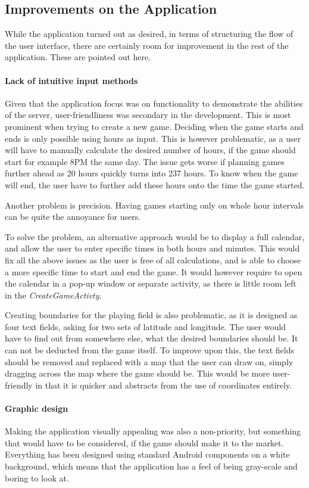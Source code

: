\subsection{Improvements on the Application}
While the application turned out as desired, in terms of structuring the flow of the user interface, there are certainly room for improvement in the rest of the application. These are pointed out here.

\paragraph{Lack of intuitive input methods}
Given that the application focus was on functionality to demonstrate the abilities of the server, user-friendliness was secondary in the development. This is most prominent when trying to create a new game. Deciding when the game starts and ends is only possible using hours as input. This is however problematic, as a user will have to manually calculate the desired number of hours, if the game should start for example 8PM the same day. The issue gets worse if planning games further ahead as 20 hours quickly turns into 237 hours. To know when the game will end, the user have to further add these hours onto the time the game started.

Another problem is precision. Having games starting only on whole hour intervals can be quite the annoyance for users.

To solve the problem, an alternative approach would be to display a full calendar, and allow the user to enter specific times in both hours and minutes. This would fix all the above issues as the user is free of all calculations, and is able to choose a more specific time to start and end the game. It would however require to open the calendar in a pop-up window or separate activity, as there is little room left in the \textit{CreateGameActivty}.

Creating boundaries for the playing field is also problematic, as it is designed as four text fields, asking for two sets of latitude and longitude. The user would have to find out from somewhere else, what the desired boundaries should be. It can not be deducted from the game itself. To improve upon this, the text fields should be removed and replaced with a map that the user can draw on, simply dragging across the map where the game should be. This would be more user-friendly in that it is quicker and abstracts from the use of coordinates entirely.

\paragraph{Graphic design}
Making the application visually appealing was also a non-priority, but something that would have to be considered, if the game should make it to the market. Everything has been designed using standard Android components on a white background, which means that the application has a feel of being gray-scale and boring to look at.

